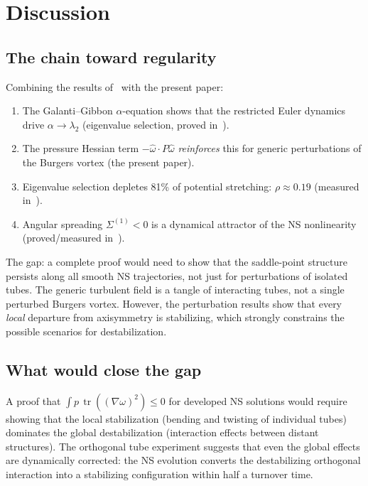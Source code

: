 \documentclass[11pt,a4paper]{article}
\theoremstyle{plain}
\theoremstyle{definition}
\theoremstyle{remark}
\DeclareMathOperator{\tr}{tr}
\begin{document}
\section{Discussion}\label{sec:discussion}

\subsection{The chain toward regularity}

Combining the results
of~\cite{Fontes2026spread,Fontes2026eigen} with
the present paper:

\begin{enumerate}[label=(\roman*),leftmargin=2em]
\item The Galanti--Gibbon $\alpha$-equation
  shows that the restricted Euler dynamics
  drive $\alpha\to\lambda_2$ (eigenvalue
  selection, proved
  in~\cite{Fontes2026eigen}).
\item The pressure Hessian term
  $-\hat\omega\cdot P\hat\omega$
  \emph{reinforces} this for generic
  perturbations of the Burgers vortex
  (the present paper).
\item Eigenvalue selection depletes 81\% of
  potential stretching: $\rho\approx 0.19$
  (measured in~\cite{Fontes2026eigen}).
\item Angular spreading
  $\Sigma^{(1)}<0$ is a dynamical attractor
  of the NS nonlinearity
  (proved/measured in~\cite{Fontes2026spread}).
\end{enumerate}

The gap: a complete proof would need to show
that the saddle-point structure persists along
all smooth NS trajectories, not just for
perturbations of isolated tubes.  The generic
turbulent field is a tangle of interacting tubes,
not a single perturbed Burgers vortex.  However,
the perturbation results show that every
\emph{local} departure from axisymmetry is
stabilizing, which strongly constrains the
possible scenarios for destabilization.

\subsection{What would close the gap}

A proof that $\int p\,\tr((\nabla\omega)^2)\leq 0$
for developed NS solutions would require showing
that the local stabilization (bending and twisting
of individual tubes) dominates the global
destabilization (interaction effects between
distant structures).  The orthogonal tube
experiment suggests that even the global effects
are dynamically corrected: the NS evolution
converts the destabilizing orthogonal interaction
into a stabilizing configuration within half a
turnover time.
\end{document}
